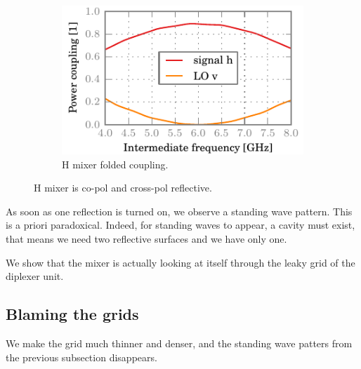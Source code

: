 \begin{figure}[hbtp]
    \\
    \begin{subfigure}[b]{.5\textwidth}
        \includegraphics{chapter_3/05_mh_cocr_h_ssb}%
        \caption{H mixer folded coupling.}
    \end{subfigure}%
    \caption{H mixer is co-pol and cross-pol reflective.}
    \label{fig:05_mh_cocr}
\end{figure}

As soon as one reflection is turned on, we observe a standing wave pattern.
This is a priori paradoxical.
Indeed, for standing waves to appear, a cavity must exist, that means we need two reflective surfaces and we have only one.

We show that the mixer is actually looking at itself through the leaky grid of the diplexer unit.

\clearpage
\subsection{Blaming the grids}
We make the grid much thinner and denser, and the standing wave patters from the previous subsection disappears.

